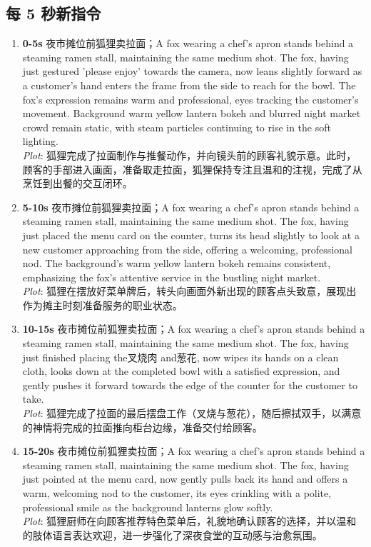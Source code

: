 \documentclass[11pt,a4paper]{article}
\begin{document}
\subsection*{每 5 秒新指令}
\begin{enumerate}
\item \textbf{0-5s} 夜市摊位前狐狸卖拉面；A fox wearing a chef's apron stands behind a steaming ramen stall, maintaining the same medium shot. The fox, having just gestured 'please enjoy' towards the camera, now leans slightly forward as a customer's hand enters the frame from the side to reach for the bowl. The fox's expression remains warm and professional, eyes tracking the customer's movement. Background warm yellow lantern bokeh and blurred night market crowd remain static, with steam particles continuing to rise in the soft lighting.\\\newline \textit{Plot}: 狐狸完成了拉面制作与推餐动作，并向镜头前的顾客礼貌示意。此时，顾客的手部进入画面，准备取走拉面，狐狸保持专注且温和的注视，完成了从烹饪到出餐的交互闭环。
\item \textbf{5-10s} 夜市摊位前狐狸卖拉面；A fox wearing a chef's apron stands behind a steaming ramen stall, maintaining the same medium shot. The fox, having just placed the menu card on the counter, turns its head slightly to look at a new customer approaching from the side, offering a welcoming, professional nod. The background's warm yellow lantern bokeh remains consistent, emphasizing the fox's attentive service in the bustling night market.\\\newline \textit{Plot}: 狐狸在摆放好菜单牌后，转头向画面外新出现的顾客点头致意，展现出作为摊主时刻准备服务的职业状态。
\item \textbf{10-15s} 夜市摊位前狐狸卖拉面；A fox wearing a chef's apron stands behind a steaming ramen stall, maintaining the same medium shot. The fox, having just finished placing the叉烧肉 and葱花, now wipes its hands on a clean cloth, looks down at the completed bowl with a satisfied expression, and gently pushes it forward towards the edge of the counter for the customer to take.\\\newline \textit{Plot}: 狐狸完成了拉面的最后摆盘工作（叉烧与葱花），随后擦拭双手，以满意的神情将完成的拉面推向柜台边缘，准备交付给顾客。
\item \textbf{15-20s} 夜市摊位前狐狸卖拉面；A fox wearing a chef's apron stands behind a steaming ramen stall, maintaining the same medium shot. The fox, having just pointed at the menu card, now gently pulls back its hand and offers a warm, welcoming nod to the customer, its eyes crinkling with a polite, professional smile as the background lanterns glow softly.\\\newline \textit{Plot}: 狐狸厨师在向顾客推荐特色菜单后，礼貌地确认顾客的选择，并以温和的肢体语言表达欢迎，进一步强化了深夜食堂的互动感与治愈氛围。

\end{enumerate}
\end{document}
